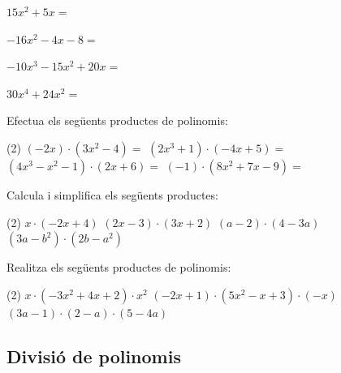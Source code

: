 \begin{mylist}
\begin{tasks}
	\task  $15x^2+5x=$
	   
	\task  $-16x^2-4x-8=$   
	   
	\task  $-10x^{3} -15x^{2} +20x=$   
	
	\task  $30x^{4} +24x^{2}=$
\end{tasks}

\answers{[$2(x^2+x+1)$, $x(x+1)$, $5x(3x+1)$, $-4(4x^2+x+2)$, $-5x(2x^2+3x-4)$, $6x^2(5x^2+6)$]}

\exer  Efectua els següents productes de polinomis:
\begin{tasks}(2)
	\task $(-2x)\cdot (3x^{2} -4)=$
	\task $(2x^{3} +1)\cdot (-4x+5)=$
	\task $(4x^{3} -x^{2} -1)\cdot (2x+6)=$
	\task $(-1)\cdot (8x^{2} +7x-9)=$
\end{tasks}  

 \answers{[$-6x^3+8x$, $-8x^4+10x^3-4x+5$, $8x^4+22x^3-6x^2-2x-6$, $-8x^2-7x+9$]}

\exer  Calcula i simplifica els següents productes: 

\begin{tasks}(2)
	\task   $x\cdot (-2x+4)$     
	\task   $(2x-3)\cdot (3x+2)$    
	\task   $(a-2)\cdot (4-3a)$  
	\task   $(3a-b^{2} )\cdot (2b-a^{2} )$ 
\end{tasks}

\answers{[$-2x^2+4x$, $6x^2-5x-6$, $-3a^2+10a-8$, $-3a^3 + a^2b^2+6ab-2b^3$]}


\exer[1]  Realitza els següents productes de polinomis:

\begin{tasks}(2)
	\task  $x\cdot (-3x^{2} +4x+2)\cdot x^{2} $  
	\task $(-2x+1)\cdot (5x^{2} -x+3)\cdot (-x)$  
	\task  $(3a-1)\cdot (2-a)\cdot (5-4a)$
\end{tasks}
\answers[cols=1]{[$-3x^5+4x^4+2x^3$, $10x^4-7x^3+7x^2-3x$, $12\,a^3-43\,a^2+43\,a-10$]}

\end{mylist}

\subsection{Divisió de polinomis}

